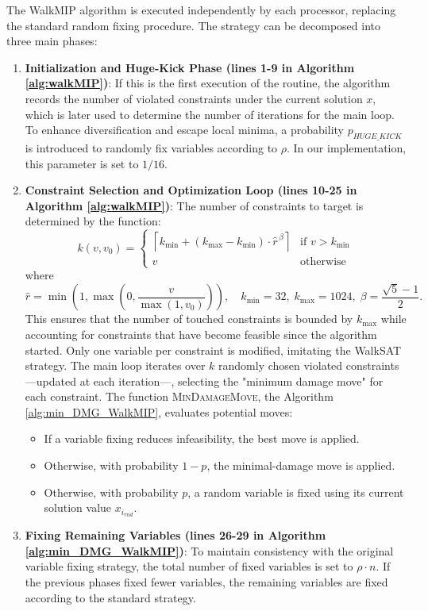 The WalkMIP algorithm is executed independently by each processor, replacing the standard random fixing procedure. The strategy can be decomposed into three main phases:

\begin{enumerate}
    \item \textbf{Initialization and Huge-Kick Phase (lines 1-9 in Algorithm \ref{alg:walkMIP})}: If this is the first execution of the routine, the algorithm records the number of violated constraints under the current solution $x$, which is later used to determine the number of iterations for the main loop. To enhance diversification and escape local minima, a probability $p_{HUGE\_KICK}$ is introduced to randomly fix variables according to $\rho$. In our implementation, this parameter is set to $1/16$.
    
    \item \textbf{Constraint Selection and Optimization Loop (lines 10-25 in Algorithm \ref{alg:walkMIP})}: The number of constraints to target is determined by the function:
    $$
    k(v, v_0) =
    \begin{cases}
    \left\lceil k_{\min} + (k_{\max}-k_{\min}) \cdot \hat{r}^{\,\beta} \right\rceil & \text{if } v > k_{\min} \\[0.5em]
    v & \text{otherwise}
    \end{cases}
    $$
    where
    $$
    \hat{r} = \min\!\left(1, \max\!\left(0, \frac{v}{\max(1, v_0)}\right)\right),\quad k_{\min}=32,\; k_{\max}=1024,\; \beta=\frac{\sqrt{5}-1}{2}.
    $$
    This ensures that the number of touched constraints is bounded by $k_{\max}$ while accounting for constraints that have become feasible since the algorithm started. Only one variable per constraint is modified, imitating the WalkSAT strategy. The main loop iterates over $k$ randomly chosen violated constraints---updated at each iteration---, selecting the "minimum damage move" for each constraint. The function \textsc{MinDamageMove}, the Algorithm \ref{alg:min_DMG_WalkMIP}, evaluates potential moves:  
        \begin{itemize}
            \item If a variable fixing reduces infeasibility, the best move is applied.
            \item Otherwise, with probability $1-p$, the minimal-damage move is applied.
            \item Otherwise, with probability $p$, a random variable is fixed using its current solution value $x_{i_{rnd}}$.
        \end{itemize}
    
    \item \textbf{Fixing Remaining Variables (lines 26-29 in Algorithm \ref{alg:min_DMG_WalkMIP})}: To maintain consistency with the original variable fixing strategy, the total number of fixed variables is set to $\rho \cdot n$. If the previous phases fixed fewer variables, the remaining variables are fixed according to the standard strategy.
\end{enumerate}

